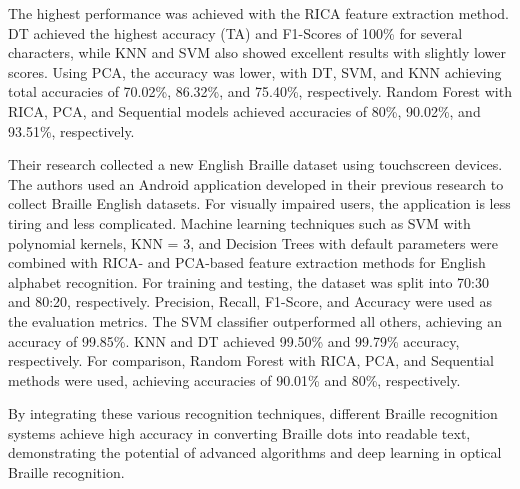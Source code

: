 The highest performance was achieved with the RICA feature extraction method. DT achieved the highest accuracy (TA) and F1-Scores of 100\% for several characters, while KNN and SVM also showed excellent results with slightly lower scores. Using PCA, the accuracy was lower, with DT, SVM, and KNN achieving total accuracies of 70.02\%, 86.32\%, and 75.40\%, respectively. Random Forest with RICA, PCA, and Sequential models achieved accuracies of 80\%, 90.02\%, and 93.51\%, respectively.

Their research collected a new English Braille dataset using touchscreen devices. The authors used an Android application developed in their previous research to collect Braille English datasets. For visually impaired users, the application is less tiring and less complicated. Machine learning techniques such as SVM with polynomial kernels, KNN = 3, and Decision Trees with default parameters were combined with RICA- and PCA-based feature extraction methods for English alphabet recognition. For training and testing, the dataset was split into 70:30 and 80:20, respectively. Precision, Recall, F1-Score, and Accuracy were used as the evaluation metrics.  The SVM classifier outperformed all others, achieving an accuracy of 99.85\%. KNN and DT achieved 99.50\% and 99.79\% accuracy, respectively. For comparison, Random Forest with RICA, PCA, and Sequential methods were used, achieving accuracies of 90.01\% and 80\%, respectively.

By integrating these various recognition techniques, different Braille recognition systems achieve high accuracy in converting Braille dots into readable text, demonstrating the potential of advanced algorithms and deep learning in optical Braille recognition. \\

